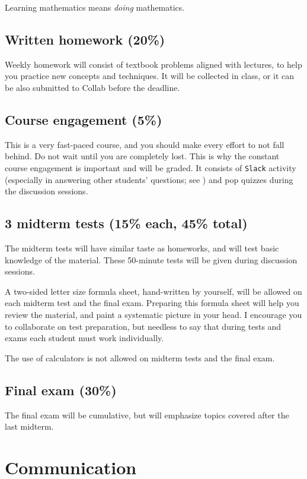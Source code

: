 \documentclass[oneside,11pt]{amsart}
\begin{document}
Learning mathematics means \emph{doing} mathematics. 

\subsection{Written homework (20\%)} Weekly homework will consist of textbook problems aligned with lectures, to help you practice new concepts and techniques. It will be collected in class, or it can be also submitted to Collab before the deadline.
 
\subsection{Course engagement (5\%)}

This is a very fast-paced course, and you should make every effort to not fall behind. Do not wait until you are completely lost. This is why the constant course engagement is important and will be graded. It consists of \texttt{Slack} activity (especially in answering other students' questions; see ) and pop quizzes during the discussion sessions.

\subsection{3 midterm tests (15\% each, 45\% total)}

The midterm tests will have similar taste as homeworks, and will test basic knowledge of the material. These 50-minute tests will be given during discussion sessions.

A two-sided letter size formula sheet, hand-written by yourself, will be allowed on each midterm test and the final exam. Preparing this formula sheet will help you review the material, and paint a systematic picture in your head. I encourage you to collaborate on test preparation, but needless to say that during tests and exams each student must work individually.

The use of calculators is not allowed on midterm tests and the final exam.

\subsection{Final exam (30\%)}
The final exam will be cumulative, but will emphasize topics covered after the last midterm.

\section{Communication} \label{comm} 
\end{document}

